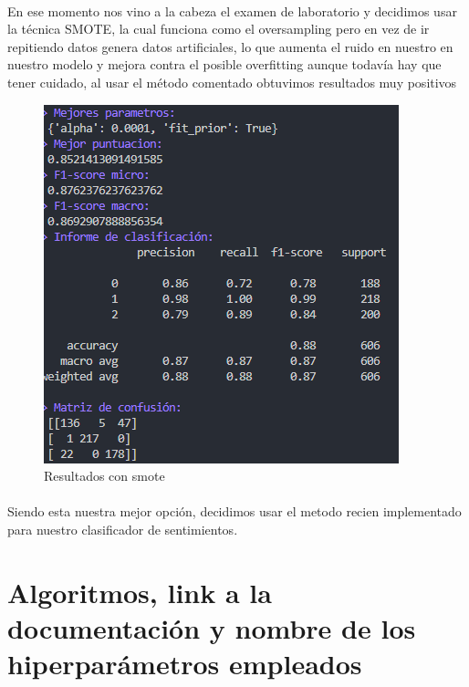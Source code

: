 \documentclass{report}
\begin{document}
                \paragraph*{}
                {
                    En ese momento nos vino a la cabeza el examen de laboratorio y decidimos usar la técnica SMOTE, la cual funciona como el oversampling pero en vez de ir repitiendo datos genera datos artificiales, lo que aumenta el ruido en nuestro en nuestro modelo y mejora contra el posible overfitting aunque todavía hay que tener cuidado, al usar el método comentado obtuvimos resultados muy positivos \color{green}{Mejor puntuacion:}
                }
                \begin{figure}[H]
                    \centering
                    \includegraphics[width=\textwidth]{img/SMOTE.png}
                    \caption{Resultados con smote}
                \end{figure}
                \paragraph*{}{
                Siendo esta nuestra mejor opción, decidimos usar el metodo recien implementado para nuestro clasificador de sentimientos.
                }
        \clearpage\section{Algoritmos, link a la documentación y nombre de los hiperparámetros empleados}
\end{document}
